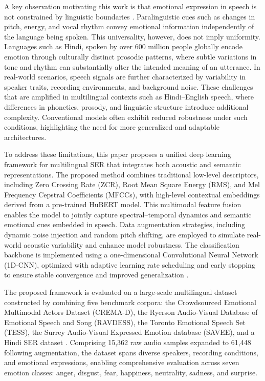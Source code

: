 \documentclass[iicol,sn-mathphys-num]{sn-jnl}%
\theoremstyle{thmstyleone}%
\theoremstyle{thmstyletwo}%
\theoremstyle{thmstylethree}%
\begin{document}
A key observation motivating this work is that emotional expression in speech is not constrained by linguistic boundaries \cite{r20}. Paralinguistic cues such as changes in pitch, energy, and vocal rhythm convey emotional information independently of the language being spoken. This universality, however, does not imply uniformity. Languages such as Hindi, spoken by over 600 million people globally encode emotion through culturally distinct prosodic patterns, where subtle variations in tone and rhythm can substantially alter the intended meaning of an utterance. In real-world scenarios, speech signals are further characterized by variability in speaker traits, recording environments, and background noise. These challenges that are amplified in multilingual contexts such as Hindi–English speech, where differences in phonetics, prosody, and linguistic structure introduce additional complexity. Conventional models often exhibit reduced robustness under such conditions, highlighting the need for more generalized and adaptable architectures.

To address these limitations, this paper proposes a unified deep learning framework for multilingual SER that integrates both acoustic and semantic representations. The proposed method combines traditional low-level descriptors, including  Zero Crossing Rate (ZCR), Root Mean Square Energy (RMS), and Mel Frequency Cepstral Coefficients (MFCCs), with high-level contextual embeddings derived from a pre-trained HuBERT model. This multimodal feature fusion enables the model to jointly capture spectral–temporal dynamics and semantic emotional cues embedded in speech. Data augmentation strategies, including dynamic noise injection and random pitch shifting, are employed to simulate real-world acoustic variability and enhance model robustness. The classification backbone is implemented using a one-dimensional Convolutional Neural Network (1D-CNN), optimized with adaptive learning rate scheduling and early stopping to ensure stable convergence and improved generalization\cite{r23, r24} .

The proposed framework is evaluated on a large-scale multilingual dataset constructed by combining five benchmark corpora: the Crowdsourced Emotional Multimodal Actors Dataset (CREMA-D), the Ryerson Audio-Visual Database of Emotional Speech and Song (RAVDESS), the Toronto Emotional Speech Set (TESS), the Surrey Audio-Visual Expressed Emotion database (SAVEE), and a Hindi SER dataset \cite{r25, r26, r27, r28}. Comprising 15,362 raw audio samples  expanded to 61,448 following augmentation, the dataset spans diverse speakers, recording conditions, and emotional expressions, enabling comprehensive evaluation across seven emotion classes: anger, disgust, fear, happiness, neutrality, sadness, and surprise.
\end{document}
